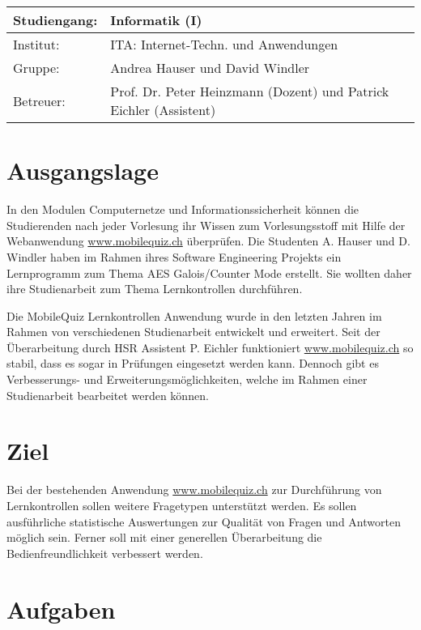 

{\renewcommand{\arraystretch}{1.5}
\begin{tabular}{l l}
	Studiengang: & Informatik (I) \\ 
	\hline
	Institut: & ITA: Internet-Techn. und Anwendungen \\ 
	Gruppe: & Andrea Hauser und David Windler \\ 
	\hline 
	Betreuer: & Prof. Dr. Peter Heinzmann (Dozent) und Patrick Eichler (Assistent)
\end{tabular} 
}


\section{Ausgangslage}

In den Modulen Computernetze und Informationssicherheit können die Studierenden nach jeder Vorlesung ihr Wissen zum Vorlesungsstoff mit Hilfe der Webanwendung \url{www.mobilequiz.ch}  überprüfen. Die Studenten A. Hauser und D. Windler haben im Rahmen ihres Software Engineering Projekts ein Lernprogramm zum Thema AES Galois/Counter Mode erstellt. Sie wollten daher ihre Studienarbeit zum Thema Lernkontrollen durchführen.

Die MobileQuiz Lernkontrollen Anwendung wurde in den letzten Jahren im Rahmen von verschiedenen Studienarbeit entwickelt und erweitert. Seit der Überarbeitung durch HSR Assistent P. Eichler funktioniert \url{www.mobilequiz.ch} so stabil, dass es sogar in Prüfungen eingesetzt werden kann.  Dennoch gibt es Verbesserungs- und Erweiterungsmöglichkeiten, welche im Rahmen einer Studienarbeit bearbeitet werden können.

\section{Ziel}
Bei der bestehenden Anwendung \url{www.mobilequiz.ch} zur Durchführung von Lernkontrollen sollen weitere Fragetypen unterstützt werden. Es sollen ausführliche statistische Auswertungen zur Qualität von Fragen und Antworten möglich sein. Ferner soll mit einer generellen Überarbeitung die Bedienfreundlichkeit verbessert werden.

\section{Aufgaben}

